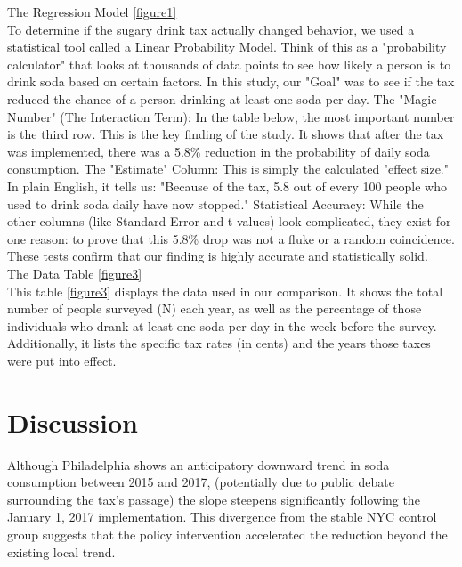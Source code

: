 \documentclass[12pt, a4paper]{article}
\begin{document}
The Regression Model \ref{figure1}
\\
To determine if the sugary drink tax actually changed behavior, we used a statistical tool called a Linear Probability Model. Think of this as a "probability calculator" that looks at thousands of data points to see how likely a person is to drink soda based on certain factors.
In this study, our "Goal" was to see if the tax reduced the chance of a person drinking at least one soda per day. The "Magic Number" (The Interaction Term): In the table below, the most important number is the third row. This is the key finding of the study. It shows that after the tax was implemented, there was a 5.8\% reduction in the probability of daily soda consumption. The "Estimate" Column: This is simply the calculated "effect size." In plain English, it tells us: "Because of the tax, 5.8 out of every 100 people who used to drink soda daily have now stopped." Statistical Accuracy: While the other columns (like Standard Error and t-values) look complicated, they exist for one reason: to prove that this 5.8\% drop was not a fluke or a random coincidence. These tests confirm that our finding is highly accurate and statistically solid.
\\

The Data Table \ref{figure3}
\\
This table \ref{figure3} \cite{CDC_YRBSS_2019} displays the data used in our comparison. It shows the total number of people surveyed (N) each year, as well as the percentage of those individuals who drank at least one soda per day in the week before the survey. Additionally, it lists the specific tax rates (in cents) and the years those taxes were put into effect.


\section{Discussion}
Although Philadelphia shows an anticipatory downward trend in soda consumption between 2015 and 2017, (potentially due to public debate surrounding the tax's passage) the slope steepens significantly following the January 1, 2017 implementation. This divergence from the stable NYC control group suggests that the policy intervention accelerated the reduction beyond the existing local trend.
\\
\end{document}

